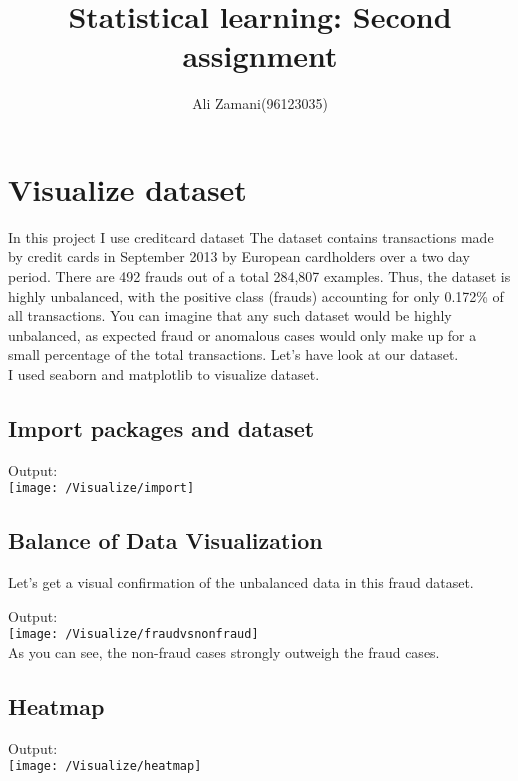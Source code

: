 \documentclass[17pt]{report}
\title{
	{\large Statistical learning: Second assignment}\\}
\author{Ali Zamani(96123035)}
\begin{document}
\maketitle

\newpage
\section{Visualize dataset}
In this project I use creditcard dataset  The dataset contains transactions made by credit cards in September 2013 by European cardholders over a two day period. There are 492 frauds out of a total 284,807 examples. Thus, the dataset is highly unbalanced, with the positive class (frauds) accounting for only 0.172\% of all transactions. You can imagine that any such dataset would be highly unbalanced, as expected fraud or anomalous cases would only make up for a small percentage of the total transactions. Let's have look at our dataset.
\\
I used seaborn and matplotlib to visualize dataset.
\subsection{Import packages and dataset}

Output:\\
\texttt{[image: /Visualize/import]}\\
\subsection{Balance of Data Visualization}
Let's get a visual confirmation of the unbalanced data in this fraud dataset.

Output:\\
\texttt{[image: /Visualize/fraudvsnonfraud]}\\
As you can see, the non-fraud cases strongly outweigh the fraud cases.
\subsection{Heatmap}

Output:\\
\texttt{[image: /Visualize/heatmap]}\\
\end{document}
